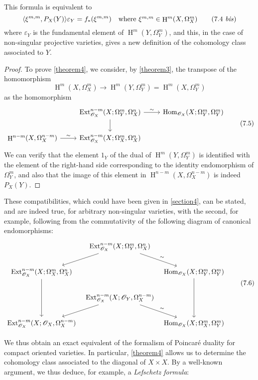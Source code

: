 \documentclass{article}
\theoremstyle{plain}
\theoremstyle{definition}
\newcommand{\sh}[1]{{\mathscr{#1}}}
\DeclareMathOperator{\Ext}{Ext}
\DeclareMathOperator{\Hom}{Hom}
\DeclareMathOperator{\HH}{H}
\newcommand{\oldpage}[1]{\marginpar{\footnotesize$\Big\vert$ \textit{p.~#1}}}
\begin{document}
This formula is equivalent to
\[
\label{7.4bis}
  \langle \xi^{m,m}, P_X(Y) \rangle \varepsilon_Y
  = f_*(\xi^{m,m})
  \quad\mbox{where $\xi^{m,m}\in\HH^m(X,\Omega_X^m)$}
\tag{7.4~\emph{bis}}
\]
where $\varepsilon_Y$ is the fundamental element of $\HH^m(Y,\Omega_Y^m)$, and this, in the case of non-singular projective varieties, gives a new definition of the cohomology class associated to $Y$.

\begin{proof}
  To prove \cref{theorem4}, we consider, by \cref{theorem3}, the transpose of the homomorphism
  \[
    \HH^m(X,\Omega_X^m) \to \HH^m(Y,\Omega_Y^m) = \HH^m(X,\Omega_Y^m)
  \]
  as the homomorphism
  \[
  \label{7.5}
    \begin{tikzcd}
      &\Ext_{\sh{O}_X}^{n-m}(X;\Omega_Y^m,\Omega_X^n)
        \rar["\sim"] \dar
      &\Hom_{\sh{O}_X}(X;\Omega_Y^m,\Omega_Y^m)
    \\
      \HH^{n-m}(X,\Omega_X^{n-m})
        \rar["\sim"]
      &\Ext_{\sh{O}_X}^{n-m}(X;\Omega_X^m,\Omega_X^n)
      &
    \end{tikzcd}
  \tag{7.5}
  \]
  We can verify that the element $1_Y$ of the dual of $\HH^m(Y,\Omega_Y^m)$ is identified with the element of the right-hand side corresponding to the identity endomorphism of $\Omega_Y^m$, and also that the image of this element in $\HH^{n-m}(X,\Omega_X^{n-m})$ is indeed $P_X(Y)$.
\end{proof}

These compatibilities, which could have been given in \cref{section4}, can be stated, and are indeed true, for arbitrary non-singular varieties, with the second,
\oldpage{149-21}
for example, following from the commutativity of the following diagram of canonical endomorphisms:
\[
\label{7.6}
  \begin{tikzcd}[column sep=tiny]
    & \Ext_{\sh{O}_X}^{n-m}(X;\Omega_Y^m,\Omega_X^n)
      \ar[ld] \ar[dr,"\sim"]
    &
  \\\Ext_{\sh{O}_X}^{n-m}(X;\Omega_X^m,\Omega_X^n)
      \ar[dd]
    && \Hom_{\sh{O}_X}(X;\Omega_Y^m,\Omega_Y^m)
      \ar[dd]
  \\& \Ext_{\sh{O}_X}^{n-m}(X;\sh{O}_Y,\Omega_X^{n-m})
      \ar[ld] \ar[dr,"\sim"]
    &
  \\\Ext_{\sh{O}_X}^{n-m}(X;\sh{O}_X,\Omega_X^{n-m})
    && \Hom_{\sh{O}_X}(X;\Omega_X^m,\Omega_Y^m)
  \end{tikzcd}
\tag{7.6}
\]

We thus obtain an exact equivalent of the formalism of Poincar\'{e} duality for compact oriented varieties.
In particular, \cref{theorem4} allows us to determine the cohomology class associated to the diagonal of $X\times X$.
By a well-known argument, we thus deduce, for example, a \emph{Lefschetz formula}:
\end{document}
